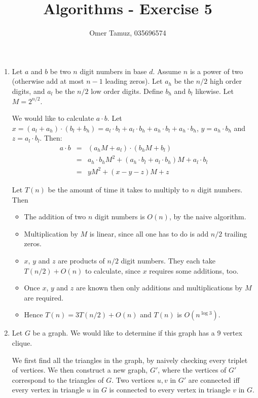 \documentclass[11pt]{article} \usepackage{amssymb}
\begin{document}
\title{Algorithms - Exercise 5}

 \author{Omer Tamuz, 035696574}
\maketitle

\begin{enumerate}
\item 
  
  Let $a$ and $b$ be two $n$ digit numbers in base $d$. 
  Assume $n$ is a power of two (otherwise add at most $n-1$ leading zeros).
  Let $a_h$ be the $n/2$ high order digits, and $a_l$ be the $n/2$ low order
  digits. Define $b_h$ and $b_l$ likewise. Let $M=2^{n/2}$. 

  We would like to calculate $a\cdot b$. Let 
  $x=(a_l+a_h)\cdot (b_l+b_h)=a_l \cdot b_l+a_l\cdot b_h+a_h\cdot b_l + a_h\cdot b_h$, 
  $y=a_h \cdot b_h$ and $z=a_l\cdot b_l$. Then: 
  \begin{eqnarray*}
    a\cdot b&=& (a_hM+a_l)\cdot(b_hM+b_l)
    \\ &=& a_h \cdot b_hM^2+(a_h\cdot b_l+a_l\cdot b_h)M+a_l\cdot b_l
    \\ &=& yM^2+(x-y-z)M+z
  \end{eqnarray*}


  Let $T(n)$ be the amount of time it takes to multiply to $n$ digit numbers.
  Then
  \begin{itemize}
  \item The addition of two $n$ digit numbers is $O(n)$, by the naive algorithm.
  \item Multiplication by $M$ is linear, since all one has to do is add $n/2$
  trailing zeros.
  \item $x$, $y$ and $z$ are products of $n/2$ digit numbers. They each take 
    $T(n/2) + O(n)$  to calculate, since $x$ requires some additions, too.
  \item Once $x$, $y$ and $z$ are known then only additions and multiplications
    by $M$ are required.
  \item Hence  $T(n)=3T(n/2)+O(n)$ and $T(n)$ is $O(n^{\log 3})$.

  \end{itemize}


  \item Let $G$ be a graph. We would like to determine if this graph has
    a 9 vertex clique. 

    We first find all the triangles in the graph, by naively checking every
    triplet of vertices. We then construct a new graph, $G'$, where the 
    vertices of $G'$ correspond to the triangles of $G$. Two vertices $u,v$ 
    in $G'$ are connected iff every vertex in triangle $u$ in $G$ is connected
    to every vertex in triangle $v$ in $G$. 


\end{enumerate}
\end{document}
